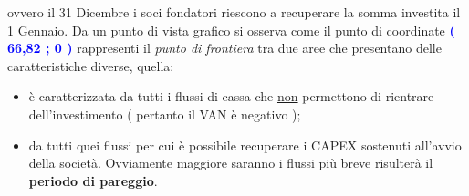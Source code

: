 \newline
\newline
\newline
\newline
\newline
\newline
ovvero il 31 Dicembre i soci fondatori riescono a recuperare la somma investita il 1 Gennaio. 
Da un punto di vista grafico si osserva come il punto di coordinate \textbf{\textcolor{blue}{( 66,82 ; 0 )}} rappresenti il \textit{punto di frontiera} tra due aree che presentano delle caratteristiche diverse, quella:
\begin{itemize}
\item \textbf{\color{red}{rossa}} è caratterizzata da tutti i flussi di cassa che \underline{non} permettono di rientrare dell'investimento ( pertanto il VAN è negativo );
\item \textbf{\color{green}{verde}} da tutti quei flussi per cui è possibile recuperare i CAPEX sostenuti all'avvio della società. Ovviamente maggiore saranno i flussi più breve risulterà il \textbf{periodo di pareggio}.
\end{itemize}


